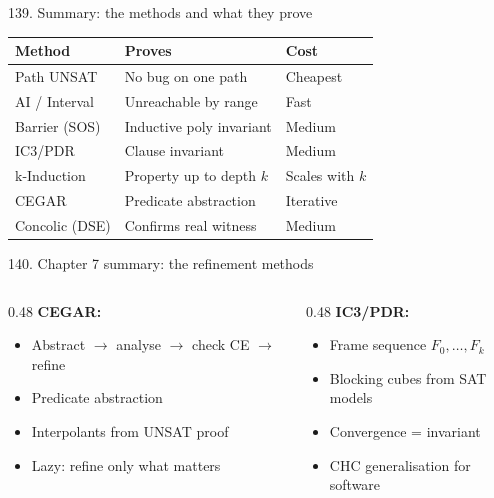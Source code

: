 \documentclass[aspectratio=169]{beamer}
\begin{document}
\begin{frame}{139. Summary: the methods and what they prove}
\begin{center}
\begin{tabular}{lll}
\textbf{Method} & \textbf{Proves} & \textbf{Cost} \\ \hline
Path UNSAT & No bug on one path & Cheapest \\
AI / Interval & Unreachable by range & Fast \\
Barrier (SOS) & Inductive poly invariant & Medium \\
IC3/PDR & Clause invariant & Medium \\
k-Induction & Property up to depth $k$ & Scales with $k$ \\
CEGAR & Predicate abstraction & Iterative \\
Concolic (DSE) & Confirms real witness & Medium \\
\end{tabular}
\end{center}
\end{frame}

\begin{frame}{140. Chapter 7 summary: the refinement methods}
\begin{columns}
\begin{column}{0.48\textwidth}
\textbf{CEGAR:}
\begin{itemize}
  \item Abstract $\to$ analyse $\to$ check CE $\to$ refine
  \item Predicate abstraction
  \item Interpolants from UNSAT proof
  \item Lazy: refine only what matters
\end{itemize}
\end{column}
\begin{column}{0.48\textwidth}
\textbf{IC3/PDR:}
\begin{itemize}
  \item Frame sequence $F_0, \ldots, F_k$
  \item Blocking cubes from SAT models
  \item Convergence = invariant
  \item CHC generalisation for software
\end{itemize}
\end{column}
\end{columns}
\end{frame}

\end{document}
